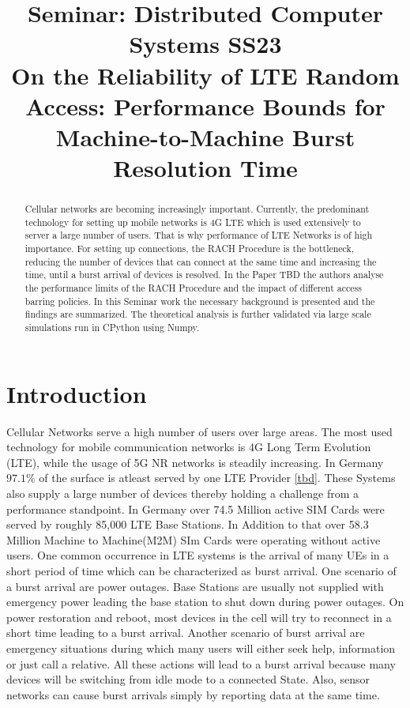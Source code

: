 \documentclass[conference]{IEEEtran}
\begin{document}
\title{Seminar: Distributed Computer Systems SS23\\
{\footnotesize On the Reliability of LTE Random Access: Performance Bounds for Machine-to-Machine Burst Resolution Time}}



\author{
}
\maketitle

\begin{abstract}
    Cellular networks are becoming increasingly important.
    Currently, the predominant technology for setting up mobile networks is 4G LTE which is used extensively to server a large number of users.
    That is why performance of LTE Networks is of high importance.
    For setting up connections, the RACH Procedure is the bottleneck, reducing the number of devices that can connect at the same time and increasing the time, until a burst arrival of devices is resolved.
    In the Paper TBD the authors analyse the performance limits of the RACH Procedure and the impact of different access barring policies.
    In this Seminar work the necessary background is presented and the findings are summarized.
    The theoretical analysis is further validated via large scale simulations run in CPython using Numpy.
\end{abstract}


\section{Introduction}
Cellular Networks serve a high number of users over large areas.
The most used technology for mobile communication networks is 4G Long Term Evolution (LTE), while the usage of 5G NR networks is steadily increasing.
In Germany $97.1\%$ of the surface is atleast served by one LTE Provider \ref{tbd}.
These Systems also supply a large number of devices thereby holding a challenge from a performance standpoint.
In Germany over 74.5 Million active SIM Cards were served by roughly 85,000 LTE Base Stations.
In Addition to that over 58.3 Million Machine to Machine(M2M) SIm Cards were operating without active users.
One common occurrence in LTE systems is the arrival of many UEs in a short period of time which can be characterized as burst arrival.
One scenario of a burst arrival are power outages.
Base Stations are usually not supplied with emergency power leading the base station to shut down during power outages.
On power restoration and reboot, most devices in the cell will try to reconnect in a short time leading to a burst arrival.
Another scenario of burst arrival are emergency situations during which many users will either seek help, information or just call a relative.
All these actions will lead to a burst arrival because many devices will be switching from idle mode to a connected State.
Also, sensor networks can cause burst arrivals simply by reporting data at the same time.
\end{document}
